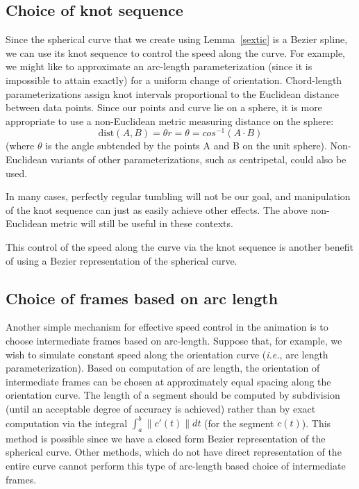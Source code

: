 \subsection{Choice of knot sequence}

Since the spherical curve that we create using Lemma~\ref{sextic}
is a Bezier spline, we can use its knot sequence to control
the speed along the curve.
For example, we might like to approximate an arc-length parameterization
(since it is impossible to attain exactly)
for a uniform change of orientation.
Chord-length parameterizations assign knot intervals proportional
to the Euclidean distance between data points.
Since our points and curve lie on a sphere, it is more appropriate
to use a non-Euclidean metric measuring distance on the sphere:
\[
\mbox{dist}(A,B) = \theta r = \theta = cos^{-1}(A \cdot B)
\]
(where $\theta$ is the angle subtended by the points A and B on the unit sphere).
Non-Euclidean variants of other parameterizations, such as centripetal,
could also be used.

In many cases, perfectly regular tumbling will not be our goal,
and manipulation of the knot sequence can just as easily achieve
other effects.
The above non-Euclidean metric will still be useful in these contexts.

This control of the speed along the curve via the knot sequence 
is another benefit of using a Bezier representation of the spherical curve.

\subsection{Choice of frames based on arc length}

Another simple mechanism for effective speed control in the animation
is to choose intermediate frames based on arc-length.
Suppose that, for example, we wish to simulate constant speed along
the orientation curve ({\em i.e.}, arc length parameterization).
Based on computation of arc length, the orientation of intermediate frames
can be chosen at approximately equal spacing along the orientation curve.
The length of a segment should be computed by subdivision
(until an acceptable degree of accuracy is achieved)
rather than by exact computation via the integral 
$\int_a^b \|c'(t)\| dt$ (for the segment $c(t)$).
This method is possible since we have a closed form Bezier representation
of the spherical curve.  Other methods, which do not have
direct representation of the entire curve cannot perform
this type of arc-length based choice of intermediate frames.

